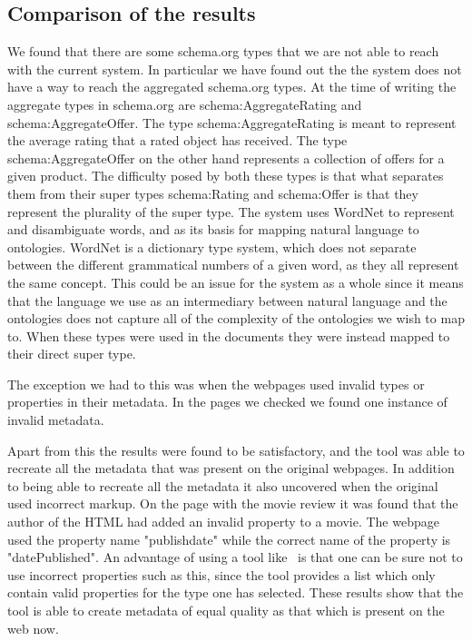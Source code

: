 \subsection{Comparison of the results}
We found that there are some schema.org types that we are not able to reach with the current system.
In particular we have found out the the system does not have a way to reach the aggregated schema.org types.
At the time of writing the aggregate types in schema.org are schema:AggregateRating and schema:AggregateOffer.
The type schema:AggregateRating is meant to represent the average rating that a rated object has received.
The type schema:AggregateOffer on the other hand represents a collection of offers for a given product.
The difficulty posed by both these types is that what separates them from their super types schema:Rating and schema:Offer
is that they represent the plurality of the super type.
The system uses WordNet to represent and disambiguate words, and as its basis for mapping natural language to ontologies.
WordNet is a dictionary type system, which does not separate between the different grammatical numbers of a given word,
as they all represent the same concept.
This could be an issue for the system as a whole since it means that the language we use as an intermediary between natural language
and the ontologies does not capture all of the complexity of the ontologies we wish to map to.
When these types were used in the documents they were instead mapped to their direct super type.

The exception we had to this was when the webpages used invalid types or properties in their metadata.
In the pages we checked we found one instance of invalid metadata.

Apart from this the results were found to be satisfactory,
and the tool was able to recreate all the metadata that was present on the original webpages.
In addition to being able to recreate all the metadata it also uncovered when the original used incorrect markup.
On the page with the movie review it was found that the author of the HTML had added an invalid property to a movie.
The webpage used the property name "publishdate" while the correct name of the property is "datePublished".
An advantage of using a tool like \theartefact\ is that one can be sure not to use incorrect properties such as this,
since the tool provides a list which only contain valid properties for the type one has selected.
These results show that the tool is able to create metadata of equal quality as that which is present on the web now.

